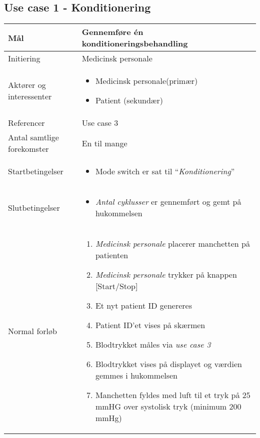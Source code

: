 \subsection{Use case 1 - Konditionering}
\begin{center}
		\begin{longtable}{ | p{} | p{}| } 
			\hline
			Mål & Gennemføre én konditioneringsbehandling  \\ 
			\hline
			Initiering &  Medicinsk personale\\
			\hline
			Aktører og interessenter & 
			\begin{itemize}
				\item Medicinsk personale(primær)
				\item Patient (sekundær)
			\end{itemize} \\ 
			\hline
			Referencer & Use case 3 \\ 
			\hline
			Antal samtlige forekomster & En til mange\\ 
			\hline	
			Startbetingelser & 
			\begin{itemize}
				\item Mode switch er sat til “\textit{Konditionering}”
			\end{itemize} \\ 
			\hline
			Slutbetingelser & 
			\begin{itemize}
				\item \textit{Antal cyklusser} er gennemført og gemt på hukommelsen
			\end{itemize} \\ 
			\hline
			Normal forløb & \begin{enumerate}
				\setlength\itemsep{0cm} %
				\item \textit{Medicinsk personale} placerer manchetten på patienten
				\item \textit{Medicinsk personale} trykker på knappen [Start/Stop]
				\item Et nyt patient ID genereres
				\subitem[Undtagelse \#1] 
				\item Patient ID’et vises på skærmen
				\item Blodtrykket måles via \textit{use case 3}
				\subitem[Undtagelse \#2]
				\item Blodtrykket vises på displayet og værdien gemmes i hukommelsen
				\item Manchetten fyldes med luft til et tryk på 25 mmHG over systolisk tryk (minimum 200 mmHg)					

\end{enumerate}
\end{longtable}
\end{center}
